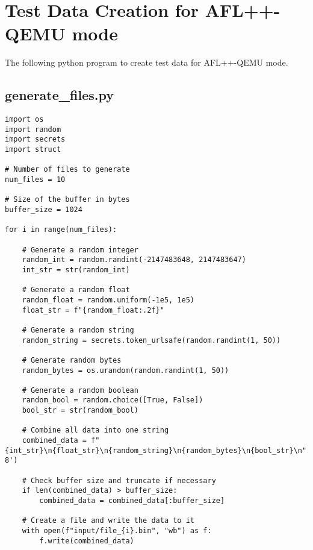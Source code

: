 

\chapter{Test Data Creation for AFL++-QEMU mode}\label{appx:third}
The following python program to create test data for AFL++-QEMU mode.

\section*{generate\_files.py}
\begin{verbatim}
import os
import random
import secrets
import struct

# Number of files to generate
num_files = 10

# Size of the buffer in bytes
buffer_size = 1024

for i in range(num_files):

    # Generate a random integer
    random_int = random.randint(-2147483648, 2147483647)
    int_str = str(random_int)

    # Generate a random float
    random_float = random.uniform(-1e5, 1e5)
    float_str = f"{random_float:.2f}"

    # Generate a random string
    random_string = secrets.token_urlsafe(random.randint(1, 50))

    # Generate random bytes
    random_bytes = os.urandom(random.randint(1, 50))

    # Generate a random boolean
    random_bool = random.choice([True, False])
    bool_str = str(random_bool)

    # Combine all data into one string
    combined_data = f"{int_str}\n{float_str}\n{random_string}\n{random_bytes}\n{bool_str}\n".encode('utf-8')

    # Check buffer size and truncate if necessary
    if len(combined_data) > buffer_size:
        combined_data = combined_data[:buffer_size]

    # Create a file and write the data to it
    with open(f"input/file_{i}.bin", "wb") as f:
        f.write(combined_data)

\end{verbatim}

